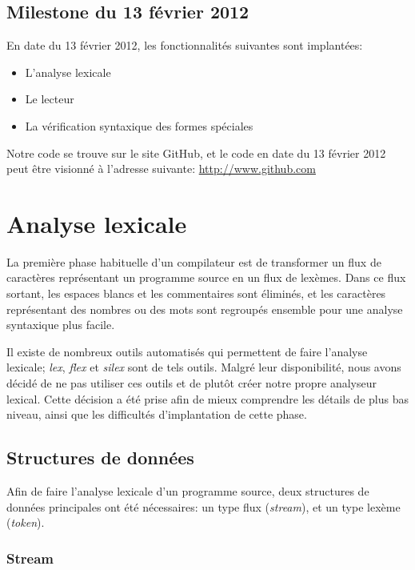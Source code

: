 \documentclass[11pt]{report}
\begin{document}
\section{Milestone du 13 février 2012}

En date du 13 février 2012, les fonctionnalités suivantes sont
implantées:

\begin{itemize}
\item L'analyse lexicale
\item Le lecteur
\item La vérification syntaxique des formes spéciales
\end{itemize}

Notre code se trouve sur le site GitHub, et le code en date du 13
février 2012 peut être visionné à l'adresse suivante:
\url{http://www.github.com}


\chapter{Analyse lexicale}

La première phase habituelle d'un compilateur est de transformer un
flux de caractères représentant un programme source en un flux de
lexèmes.  Dans ce flux sortant, les espaces blancs et les commentaires
sont éliminés, et les caractères représentant des nombres ou des mots
sont regroupés ensemble pour une analyse syntaxique plus facile.

Il existe de nombreux outils automatisés qui permettent de faire
l'analyse lexicale; \emph{lex}, \emph{flex} et \emph{silex} sont de
tels outils.  Malgré leur disponibilité, nous avons décidé de ne pas
utiliser ces outils et de plutôt créer notre propre analyseur lexical.
Cette décision a été prise afin de mieux comprendre les détails de
plus bas niveau, ainsi que les difficultés d'implantation de cette
phase.

\section{Structures de données}

Afin de faire l'analyse lexicale d'un programme source, deux
structures de données principales ont été nécessaires: un type flux
(\emph{stream}), et un type lexème (\emph{token}).

\subsection{Stream}
\end{document}
